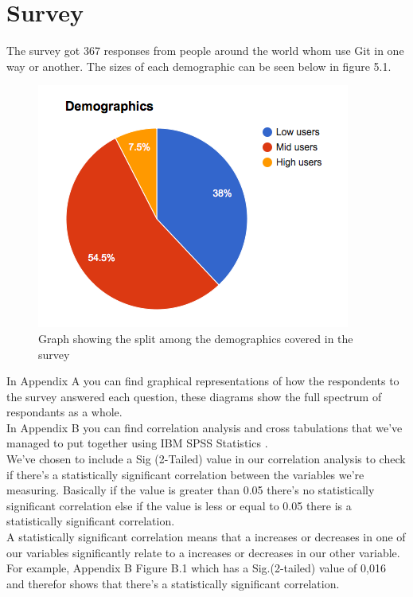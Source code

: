 \documentclass[a4paper,oneside]{bth} %
\begin{document}
			\section{Survey}
			The survey got 367 responses from people around the world whom use Git in one way or another. The sizes of each demographic can be seen below in figure 5.1.
			\begin{figure}[H]
				\centering
				\includegraphics[width=0.5\linewidth]{graphs/demo_split.png}
				\caption{Graph showing the split among the demographics covered in the survey}
				\label{fig:graph-demo-split}
			\end{figure}
			In Appendix A you can find graphical representations of how the respondents to the survey answered each question, these diagrams show the full spectrum of respondants as a whole.\\
			In Appendix B you can find correlation analysis and cross tabulations that we've managed to put together using IBM SPSS Statistics \cite{SPSS}.\\
			We've chosen to include a Sig (2-Tailed) value in our correlation analysis to check if there's a statistically significant correlation between the variables we're measuring. Basically if the value is greater than 0.05 there's no statistically significant correlation else if the value is less or equal to 0.05 there is a statistically significant correlation.\\
			A statistically significant correlation means that a increases or decreases in one of our variables significantly relate to a increases or decreases in our other variable.
			For example, Appendix B Figure B.1 which has a Sig.(2-tailed) value of 0,016 and therefor shows that there's a statistically significant correlation.\\\\
			
\end{document}
